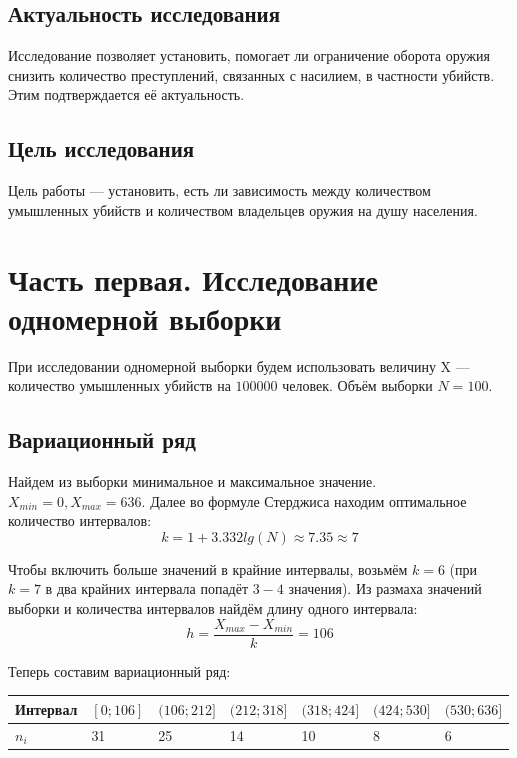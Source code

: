\documentclass[titlepage]{article}
\begin{document}
\subsection{Актуальность исследования}

Исследование позволяет установить, помогает ли ограничение оборота оружия снизить количество преступлений, связанных с насилием,
в частности убийств. Этим подтверждается её актуальность.

\subsection{Цель исследования}

Цель работы --- установить, есть ли зависимость между количеством умышленных убийств и количеством владельцев оружия на душу населения.

\section{Часть первая. Исследование одномерной выборки}

При исследовании одномерной выборки будем использовать величину X --- количество умышленных убийств на $100 000$ человек.
Объём выборки $N = 100$.

\subsection{Вариационный ряд}

Найдем из выборки минимальное и максимальное значение. $X_{min} = 0, X_{max} = 636$. Далее во формуле Стерджиса находим оптимальное количество интервалов:
\begin{equation*}
k = 1 + 3.332lg(N) \approx 7.35 \approx 7
\end{equation*}

Чтобы включить больше значений в крайние интервалы, возьмём $k = 6$ (при $k = 7$ в два крайних интервала попадёт $3 - 4$ значения).
Из размаха значений выборки и количества интервалов найдём длину одного интервала:
\begin{equation*}
h = \frac{X_{max} - X_{min}}{k} = 106
\end{equation*}

Теперь составим вариационный ряд:
\begin{table}[!ht]
    \centering
    \begin{tabular}{|l|l|l|l|l|l|l|}
    \hline
        Интервал & $[0; 106]$ & $(106; 212]$ & $(212; 318]$ & $(318; 424]$ & $(424; 530]$ & $(530; 636]$ \\ \hline
        $n_i$ & 31 & 25 & 14 & 10 & 8 & 6 \\ \hline
    \end{tabular}
\end{table}
\end{document}
